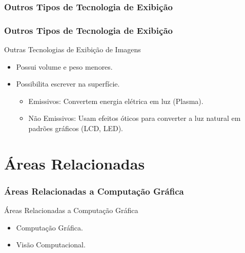 \documentclass{beamer}
\begin{document}
\subsubsection{Outros Tipos de Tecnologia de Exibição}
\begin{frame}
\frametitle{Outros Tipos de Tecnologia de Exibição}

	\begin{block}{Outras Tecnologias de Exibição de Imagens}
		\begin{itemize}
			\item Possui volume e peso menores.
			\item Possibilita escrever na superfície.
			\begin{itemize}
				\item Emissivos: Convertem energia elétrica em luz (Plasma).
				\item Não Emissivos: Usam efeitos óticos para converter a luz natural em padrões gráficos (LCD, LED).
			\end{itemize}
		\end{itemize}
	\end{block}
	
\end{frame}


\section{Áreas Relacionadas}


\begin{frame}
\frametitle{Áreas Relacionadas a Computação Gráfica}

\begin{block}{Áreas Relacionadas a Computação Gráfica}

		\begin{itemize}
			\item Computação Gráfica.
			\item Visão Computacional.
			
		\end{itemize}
\end{block}

\end{frame}



\end{document}
